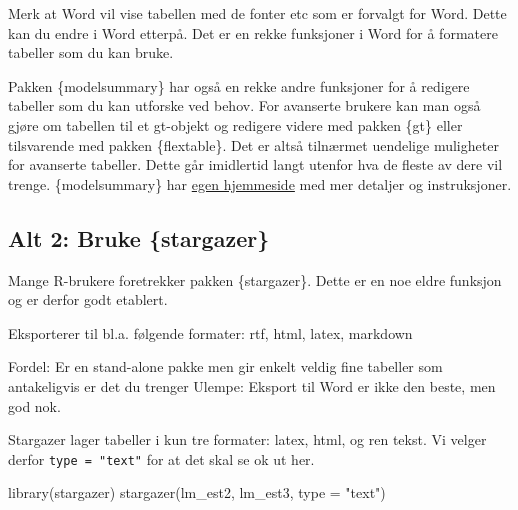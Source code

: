 \documentclass[
  norsk,
  letterpaper,
  DIV=11,
  numbers=noendperiod]{scrreprt}
\newenvironment{Shaded}{\begin{snugshade}}{\end{snugshade}}
\newcommand{\AttributeTok}[1]{\textcolor[rgb]{0.40,0.45,0.13}{#1}}
\newcommand{\FunctionTok}[1]{\textcolor[rgb]{0.28,0.35,0.67}{#1}}
\newcommand{\NormalTok}[1]{\textcolor[rgb]{0.00,0.23,0.31}{#1}}
\newcommand{\StringTok}[1]{\textcolor[rgb]{0.13,0.47,0.30}{#1}}
\theoremstyle{definition}
\theoremstyle{remark}
\begin{document}
Merk at Word vil vise tabellen med de fonter etc som er forvalgt for
Word. Dette kan du endre i Word etterpå. Det er en rekke funksjoner i
Word for å formatere tabeller som du kan bruke.

Pakken \{modelsummary\} har også en rekke andre funksjoner for å
redigere tabeller som du kan utforske ved behov. For avanserte brukere
kan man også gjøre om tabellen til et gt-objekt og redigere videre med
pakken \{gt\} eller tilsvarende med pakken \{flextable\}. Det er altså
tilnærmet uendelige muligheter for avanserte tabeller. Dette går
imidlertid langt utenfor hva de fleste av dere vil trenge.
\{modelsummary\} har
\href{https://vincentarelbundock.github.io/modelsummary/index.html}{egen
hjemmeside} med mer detaljer og instruksjoner.

\subsection{Alt 2: Bruke \{stargazer\}}\label{alt-2-bruke-stargazer}

Mange R-brukere foretrekker pakken \{stargazer\}. Dette er en noe eldre
funksjon og er derfor godt etablert.

Eksporterer til bl.a. følgende formater: rtf, html, latex, markdown

Fordel: Er en stand-alone pakke men gir enkelt veldig fine tabeller som
antakeligvis er det du trenger Ulempe: Eksport til Word er ikke den
beste, men god nok.

Stargazer lager tabeller i kun tre formater: latex, html, og ren tekst.
Vi velger derfor \texttt{type\ =\ "text"} for at det skal se ok ut her.

\begin{Shaded}
\begin{Highlighting}[]
\FunctionTok{library}\NormalTok{(stargazer)}
\FunctionTok{stargazer}\NormalTok{(lm\_est2, lm\_est3, }\AttributeTok{type =} \StringTok{"text"}\NormalTok{)}
\end{Highlighting}
\end{Shaded}
\end{document}
